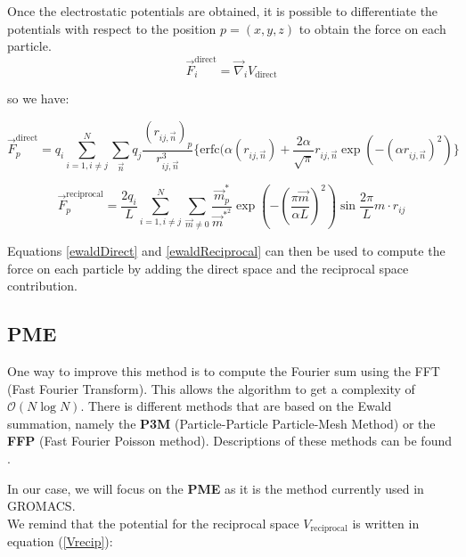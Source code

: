\documentclass[11pt,twoside,a4paper]{report}
\begin{document}
Once the electrostatic potentials are obtained, it is possible to differentiate the potentials with respect to the position $p=(x,y,z)$ to obtain the force on each particle.\\

\begin{equation}
   \overrightarrow{F}_i^{\text{direct}} = \overrightarrow{\nabla}_i V_{\text{direct}} 
\end{equation}


so we have:

\begin{equation}
\label{ewaldDirect}
   \overrightarrow{F}_p^{\text{direct}} = q_i \sum\limits_{i=1,i\neq j}^N \sum\limits_{\vec{n}} q_j \frac{(r_{ij,\vec{n}})_p}{r_{ij,\vec{n}}^3}
   \{\text{erfc}(\alpha (r_{ij,\vec{n}}) + \frac{2\alpha}{\sqrt{\pi}} r_{ij,\vec{n}} \exp(-(\alpha r_{ij,\vec{n}})^2)\}
\end{equation}


\begin{equation}
\label{ewaldReciprocal}
   \overrightarrow{F}_p^{\text{reciprocal}} = \frac{2 q_i}{L} \sum\limits_{i=1,i\neq j}^N \sum_{\vec{m} \neq 0} \frac{\vec{m}_p^*}{\vec{m}^{*^2}} \exp{(-(\frac{\pi \vec{m}}{\alpha L})^2)}\sin{\frac{2\pi}{L} m \cdot r_{ij} }
\end{equation}

Equations \ref{ewaldDirect} and \ref{ewaldReciprocal} can then be used to compute the force on each particle by adding the direct space and the reciprocal space contribution.\\


\subsection{PME}
One way to improve this method is to compute the Fourier sum using the FFT (Fast Fourier Transform). This allows the algorithm to get a complexity of $\mathcal{O}(N\log N)$. There is different methods that are based on the Ewald summation, namely the \textbf{P3M} (Particle-Particle Particle-Mesh Method) or the \textbf{FFP} (Fast Fourier Poisson method). Descriptions of these methods can be found \cite{toukmaji1996ewald}. 

In our case, we will focus on the \textbf{PME} as it is the method currently used in GROMACS. \\

We remind that the potential for the reciprocal space $V_{\text{reciprocal}}$ is written in equation (\ref{Vrecip}):
\end{document}
